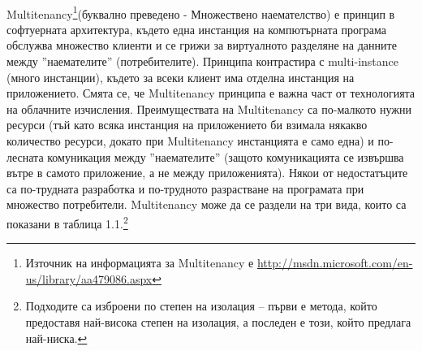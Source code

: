 \documentclass[pdftex,14pt,a4paper]{extreport}
\begin{document}
\paragraph {}
Multitenancy\footnote{Източник на информацията за Multitenancy е \url{http://msdn.microsoft.com/en-us/library/aa479086.aspx}}(буквално преведено - Множествено наемателство) е принцип в софтуерната архитектура, където една инстанция на компютърната програма обслужва множество клиенти и се грижи за виртуалното разделяне на данните между ''наемателите'' (потребителите). Принципа контрастира с multi-instance (много инстанции), където за всеки клиент има отделна инстанция на приложението. Смята се, че Multitenancy принципа е важна част от технологията на облачните изчисления. Преимуществата на Multitenancy са по-малкото нужни ресурси (тъй като всяка инстанция на приложението би взимала някакво количество ресурси, докато при Multitenancy инстанцията е само една) и по-лесната комуникация между ''наемателите'' (защото комуникацията се извършва вътре в самото приложение, а не между приложенията). Някои от недостатъците са по-трудната разработка и по-трудното разрастване на програмата при множество потребители. Multitenancy може да се раздели на три вида, които са показани в таблица 1.1.\footnote{Подходите са изброени по степен на изолация -- първи е метода, който предоставя най-висока степен на изолация, а последен е този, който предлага най-ниска.}
\end{document}
